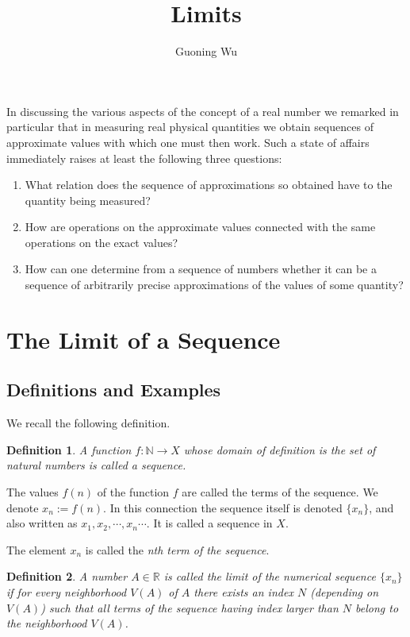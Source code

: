 \documentclass[a4paper,12pt]{article} %
\title{Limits}
\author{Guoning Wu}
\newtheorem{definition}{Definition}[section]
\begin{document}
\maketitle
In discussing the various aspects of the concept of a real number we 
remarked in particular that in measuring real physical quantities 
we obtain sequences of approximate values with which one must then 
work. Such a state of affairs immediately raises at least the following 
three questions:
\begin{enumerate}
    \item What relation does the sequence of approximations so obtained 
        have to the quantity being measured?
    \item How are operations on the approximate values connected with the 
        same operations on the exact values?
    \item How can one determine from a sequence of numbers whether it can
        be a sequence of arbitrarily precise approximations of the values 
        of some quantity?
\end{enumerate}

\section{The Limit of a Sequence}
\subsection{Definitions and Examples}
We recall the following definition.
\begin{definition}
    A function $f: \mathbb{N} \to X$ whose domain of definition is the set of 
    natural numbers is called a \textit{sequence}.
\end{definition}

The values $f(n)$ of the function $f$ are called the terms of the sequence. We 
denote $x_n  := f(n)$. In this connection the sequence itself is denoted $\{x_n\}$,
and also written as $x_1, x_2, \cdots , x_n \cdots $. It is called a sequence in $X$.

The element $x_n$ is called the \textit{nth term of the sequence}.

\begin{definition}
    A number $A \in \mathbb{R}$ is called the \textit{limit of the numerical sequence}
     $\{x_n\}$ if for every neighborhood $V(A)$ of $A$ there exists an index $N$
    (depending on $V(A)$) such that all terms of the sequence having index larger 
    than $N$ belong to the neighborhood $V(A)$.
\end{definition}
\end{document}
